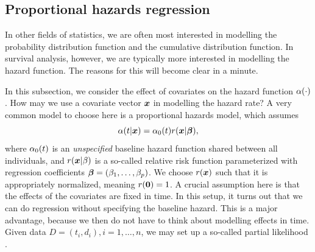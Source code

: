 \subsection{Proportional hazards regression}\label{subsec:ph-reg}
In other fields of statistics, we are often most interested in modelling the probability distribution function
and the cumulative distribution function.
In survival analysis, however, we are typically more interested in modelling the hazard function. The reasons for this will become clear in a minute.

In this subsection, we consider the effect of covariates on the hazard function $\alpha(\cdot)$.
How may we use a covariate vector $\bm{x}$ in modelling the hazard rate?
A very common model to choose here is a proportional hazards model, which assumes
\begin{equation}\label{eq:PH}
    \alpha(t|\bm{x})=\alpha_0(t)r(\bm{x}|\boldsymbol{\beta}),
\end{equation}
where $\alpha_0(t)$ is an \textit{unspecified} baseline hazard function shared between all individuals, and $r(\bm{x}|\beta)$ is a so-called relative risk function parameterized with regression coefficients $\boldsymbol{\beta}=(\beta_1,\ldots,\beta_p)$. We choose $r(\bm{x})$ such that it is appropriately normalized, meaning $r(\bm{0})=1$.
A crucial assumption here is that the effects of the covariates are fixed in time. In this setup, it turns out that we can do regression without specifying the baseline hazard. This is a major advantage, because we then do not have to think about modelling effects in time. Given data $D=(t_i,d_i),i=1,\ldots,n$, we may set up a so-called partial likelihood \citep{cox-model}.


